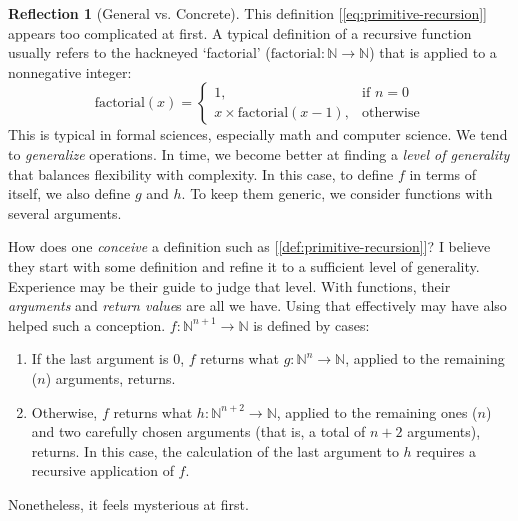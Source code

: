 \documentclass[11pt]{book}
\theoremstyle{definition}
\theoremstyle{plain}
\theoremstyle{problemstyle}
\theoremstyle{remark}
\theoremstyle{definition}
\newtheorem{reflection}{Reflection}
\begin{document}
\begin{reflection}[General vs. Concrete]
    \label{reflection:general-vs-concrete}
    This definition [\ref{eq:primitive-recursion}] appears too complicated at first. A typical definition of a recursive function usually refers to the hackneyed `factorial' ($\text{factorial}:\mathbb{N}\rightarrow\mathbb{N}$) that is applied to a nonnegative integer:
    \[ 
    \text{factorial}(x)=\begin{cases}
			1, & \text{if $n=0$}\\
            x\times\text{factorial}(x-1), & \text{otherwise}
		 \end{cases}
    \]
    This is typical in formal sciences, especially math and computer science. We tend to \emph{generalize} operations. In time, we become better at finding a \emph{level of generality} that balances flexibility with complexity. In this case, to define $f$ in terms of itself, we also define $g$ and $h$. To keep them generic, we consider functions with several arguments.

    How does one \emph{conceive} a definition such as [\ref{def:primitive-recursion}]? I believe they start with some definition and refine it to a sufficient level of generality. Experience may be their guide to judge that level. With functions, their \emph{arguments} and \emph{return value}s are all we have. Using that effectively may have also helped such a conception. $f:\mathbb{N}^{n+1}\rightarrow\mathbb{N}$ is defined by cases:
    \begin{enumerate}
        \item If the last argument is $0$, $f$ returns what $g:\mathbb{N}^n\rightarrow\mathbb{N}$, applied to the remaining ($n$) arguments, returns.
        \item Otherwise, $f$ returns what $h:\mathbb{N}^{n+2}\rightarrow\mathbb{N}$, applied to the remaining ones ($n$) and two carefully chosen arguments (that is, a total of $n+2$ arguments), returns. In this case, the calculation of the last argument to $h$ requires a recursive application of $f$.
    \end{enumerate}

    Nonetheless, it feels mysterious at first.
\end{reflection}
\end{document}
